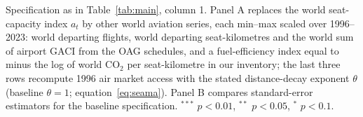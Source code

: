 \begin{table}[H]
{\begin{threeparttable}
\begin{tabular}{lcccc}
\bottomrule
\end{tabular}
\begin{tablenotes}\scriptsize
\item Specification as in Table~\ref{tab:main}, column 1. Panel A replaces the world seat-capacity index $a_t$ by other world aviation series, each min--max scaled over 1996--2023: world departing flights, world departing seat-kilometres and the world sum of airport GACI from the OAG schedules, and a fuel-efficiency index equal to minus the log of world CO$_2$ per seat-kilometre in our inventory; the last three rows recompute 1996 air market access with the stated distance-decay exponent $\theta$ (baseline $\theta=1$; equation~\ref{eq:seama}). Panel B compares standard-error estimators for the baseline specification. $^{***}$ $p<0.01$, $^{**}$ $p<0.05$, $^{*}$ $p<0.1$.
\end{tablenotes}
\end{threeparttable}}
\end{table}


